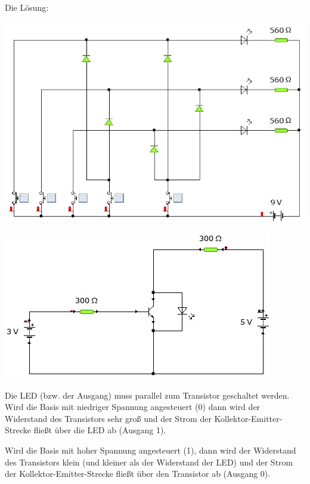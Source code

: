 \begin{Loesung}
Die Lösung:
\begin{center}
\includegraphics[scale=.6]{pics/loesdiodenlogik}
\end{center}
\end{Loesung}




\begin{Loesung}
\hfill \par
\begin{center}
\includegraphics[scale=.6]{pics/NegatorLoes}
\end{center}

Die LED (bzw. der Ausgang) muss parallel zum Transistor geschaltet werden. Wird die Basis mit niedriger Spannung angesteuert (0) dann wird der Widerstand des Transistors sehr groß und der Strom der Kollektor-Emitter-Strecke fließt über die LED ab (Ausgang 1).

Wird die Basis mit hoher Spannung angesteuert (1), dann wird der Widerstand des Transistors klein (und kleiner als der Widerstand der LED) und der Strom der Kollektor-Emitter-Strecke fließt über den Transistor ab (Ausgang 0).
\end{Loesung}


